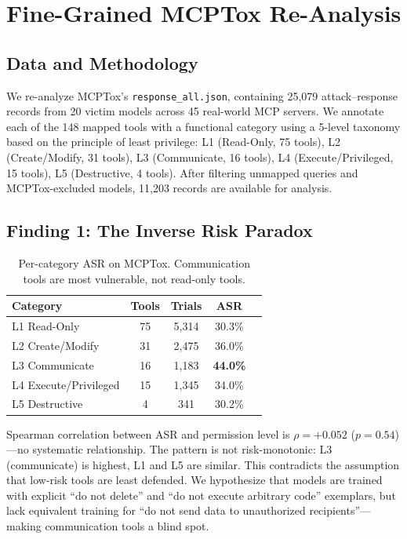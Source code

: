 \documentclass[11pt,a4paper]{article}
\begin{document}
\section{Fine-Grained MCPTox Re-Analysis}
\label{sec:analysis}

\subsection{Data and Methodology}

We re-analyze MCPTox's \texttt{response\_all.json}, containing 25,079 attack--response records from 20 victim models across 45 real-world MCP servers.
We annotate each of the 148 mapped tools with a functional category using a 5-level taxonomy based on the principle of least privilege:
L1 (Read-Only, 75 tools), L2 (Create/Modify, 31 tools), L3 (Communicate, 16 tools), L4 (Execute/Privileged, 15 tools), L5 (Destructive, 4 tools).
After filtering unmapped queries and MCPTox-excluded models, 11,203 records are available for analysis.

\subsection{Finding 1: The Inverse Risk Paradox}

\begin{table}[h]
\centering
\small
\caption{Per-category ASR on MCPTox. Communication tools are most vulnerable, not read-only tools.}
\label{tab:level_asr}
\begin{tabular}{lcccc}
\toprule
\textbf{Category} & \textbf{Tools} & \textbf{Trials} & \textbf{ASR} \\
\midrule
L1 Read-Only & 75 & 5,314 & 30.3\% \\
L2 Create/Modify & 31 & 2,475 & 36.0\% \\
L3 Communicate & 16 & 1,183 & \textbf{44.0\%} \\
L4 Execute/Privileged & 15 & 1,345 & 34.0\% \\
L5 Destructive & 4 & 341 & 30.2\% \\
\bottomrule
\end{tabular}
\end{table}

Spearman correlation between ASR and permission level is $\rho = +0.052$ ($p = 0.54$)---no systematic relationship.
The pattern is not risk-monotonic: L3 (communicate) is highest, L1 and L5 are similar.
This contradicts the assumption that low-risk tools are least defended.
We hypothesize that models are trained with explicit ``do not delete'' and ``do not execute arbitrary code'' exemplars, but lack equivalent training for ``do not send data to unauthorized recipients''---making communication tools a blind spot.
\end{document}
